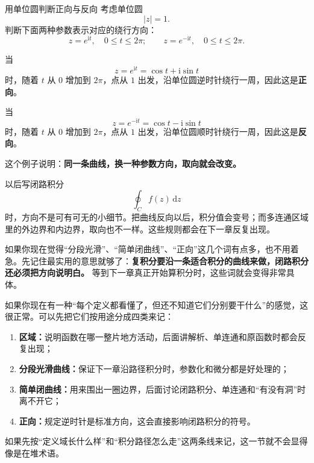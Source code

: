 \begin{lizi}{用单位圆判断正向与反向}{}
考虑单位圆
\[
    |z|=1.
\]
判断下面两种参数表示对应的绕行方向：
\[
    z=e^{\mathrm{i}t},\quad 0\le t\le 2\pi;
    \qquad
    z=e^{-\mathrm{i}t},\quad 0\le t\le 2\pi.
\]

\begin{jie}
当
\[
    z=e^{\mathrm{i}t}=\cos t+\mathrm{i}\sin t
\]
时，随着 $t$ 从 $0$ 增加到 $2\pi$，点从 $1$ 出发，沿单位圆逆时针绕行一周，因此这是\textbf{正向}。

当
\[
    z=e^{-\mathrm{i}t}=\cos t-\mathrm{i}\sin t
\]
时，随着 $t$ 从 $0$ 增加到 $2\pi$，点从 $1$ 出发，沿单位圆顺时针绕行一周，因此这是\textbf{反向}。

这个例子说明：\textbf{同一条曲线，换一种参数方向，取向就会改变。}
\end{jie}
\end{lizi}

\begin{tishi}[为什么这里要强调正向]
以后写闭路积分
\[
    \oint_C f(z)\,\mathrm{d}z
\]
时，方向不是可有可无的小细节。把曲线反向以后，积分值会变号；而多连通区域里的外边界和内边界，取向也不一样。这些规则都会在下一章反复出现。
\end{tishi}

\begin{tishi}[先把这些术语按用途记住]
如果你现在觉得``分段光滑''、``简单闭曲线''、``正向''这几个词有点多，也不用着急。先记住最实用的意思就够了：\textbf{复积分要沿一条适合积分的曲线来做，闭路积分还必须把方向说明白。} 等到下一章真正开始算积分时，这些词就会变得非常具体。
\end{tishi}

\begin{tishi}[这一串术语后面各做什么]
如果你现在有一种``每个定义都看懂了，但还不知道它们分别要干什么''的感觉，这很正常。可以先把它们按用途分成四类来记：
\begin{enumerate}
    \item \textbf{区域：}说明函数在哪一整片地方活动，后面讲解析、单连通和原函数时都会反复出现；
    \item \textbf{分段光滑曲线：}保证下一章沿路径积分时，参数化和微分都是好处理的；
    \item \textbf{简单闭曲线：}用来围出一圈边界，后面讨论闭路积分、单连通和``有没有洞''时离不开它；
    \item \textbf{正向：}规定逆时针是标准方向，这会直接影响闭路积分的符号。
\end{enumerate}
如果先按``定义域长什么样''和``积分路径怎么走''这两条线来记，这一节就不会显得像是在堆术语。
\end{tishi}

